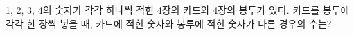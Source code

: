 1, 2, 3, 4의 숫자가 각각 하나씩 적힌 4장의 카드와 4장의 봉투가 있다. 카드를 봉투에 각각 한 장씩 넣을 때, 카드에 적힌 숫자와 봉투에 적힌 숫자가 다른 경우의 수는?
